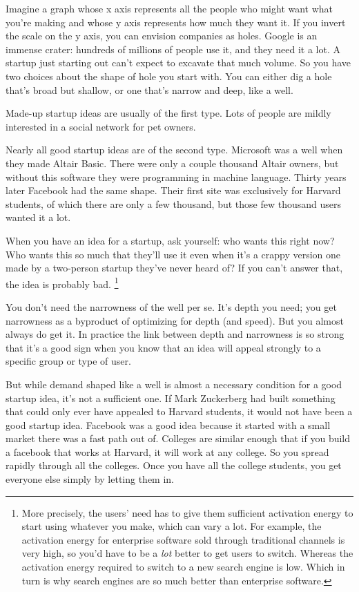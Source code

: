 Imagine a graph whose x axis represents all the people who might want
what you're making and whose y axis represents how much they want it. If
you invert the scale on the y axis, you can envision companies as holes.
Google is an immense crater: hundreds of millions of people use it, and
they need it a lot. A startup just starting out can't expect to excavate
that much volume. So you have two choices about the shape of hole you
start with. You can either dig a hole that's broad but shallow, or one
that's narrow and deep, like a well.

Made-up startup ideas are usually of the first type. Lots of people are
mildly interested in a social network for pet owners.

Nearly all good startup ideas are of the second type. Microsoft was a
well when they made Altair Basic. There were only a couple thousand
Altair owners, but without this software they were programming in
machine language. Thirty years later Facebook had the same shape. Their
first site was exclusively for Harvard students, of which there are only
a few thousand, but those few thousand users wanted it a lot.

When you have an idea for a startup, ask yourself: who wants this right
now? Who wants this so much that they'll use it even when it's a crappy
version one made by a two-person startup they've never heard of? If you
can't answer that, the idea is probably bad. \footnote{More precisely, the users' need has to give them sufficient
activation energy to start using whatever you make, which can vary a
lot. For example, the activation energy for enterprise software sold
through traditional channels is very high, so you'd have to be a
\emph{lot} better to get users to switch. Whereas the activation energy
required to switch to a new search engine is low. Which in turn is why
search engines are so much better than enterprise software.}

You don't need the narrowness of the well per se. It's depth you need;
you get narrowness as a byproduct of optimizing for depth (and speed).
But you almost always do get it. In practice the link between depth and
narrowness is so strong that it's a good sign when you know that an idea
will appeal strongly to a specific group or type of user.

But while demand shaped like a well is almost a necessary condition for
a good startup idea, it's not a sufficient one. If Mark Zuckerberg had
built something that could only ever have appealed to Harvard students,
it would not have been a good startup idea. Facebook was a good idea
because it started with a small market there was a fast path out of.
Colleges are similar enough that if you build a facebook that works at
Harvard, it will work at any college. So you spread rapidly through all
the colleges. Once you have all the college students, you get everyone
else simply by letting them in.


